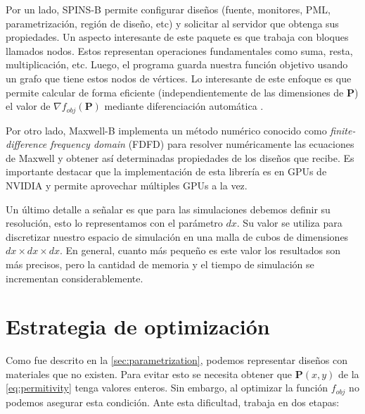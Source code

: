 Por un lado, SPINS-B permite configurar diseños (fuente, monitores, PML, parametrización, región de diseño, etc) y solicitar al servidor que obtenga sus propiedades.
Un aspecto interesante de este paquete es que trabaja con bloques llamados nodos.
Estos representan operaciones fundamentales como suma, resta, multiplicación, etc.
Luego, el programa guarda nuestra función objetivo usando un grafo que tiene estos nodos de vértices.
Lo interesante de este enfoque es que permite calcular de forma eficiente
(independientemente de las dimensiones de $\boldsymbol{P}$) 
el valor de $\nabla f_{obj}(\boldsymbol{P})$ mediante diferenciación automática \citep{Su2020}.

Por otro lado, Maxwell-B implementa un método numérico conocido como \emph{finite-difference frequency domain}
(FDFD) para resolver numéricamente las ecuaciones de Maxwell y obtener así determinadas propiedades
de los diseños que recibe.
Es importante destacar que la implementación de esta librería es en GPUs de NVIDIA y permite
aprovechar múltiples GPUs a la vez.


Un último detalle a señalar es que para las simulaciones debemos definir su resolución,
esto lo representamos con el parámetro $dx$. 
Su valor se utiliza para discretizar nuestro espacio de
simulación en una malla de cubos de dimensiones $dx \times dx \times dx$.
En general, cuanto más pequeño es este valor
los resultados son más precisos, pero la cantidad de memoria y el tiempo de
simulación se incrementan considerablemente.

\section{Estrategia de optimización}\label{sec:estrategia-optimizacion}

Como fue descrito en la \autoref{sec:parametrization}, podemos
representar diseños con materiales que no existen.
Para evitar esto se necesita obtener que $\boldsymbol{P}(x, y)$ de la \autoref{eq:permitivity} tenga valores enteros.
Sin embargo, al optimizar la función $f_{obj}$ no podemos asegurar esta condición.
Ante esta dificultad, \cite{Su2020} trabaja en dos etapas:


